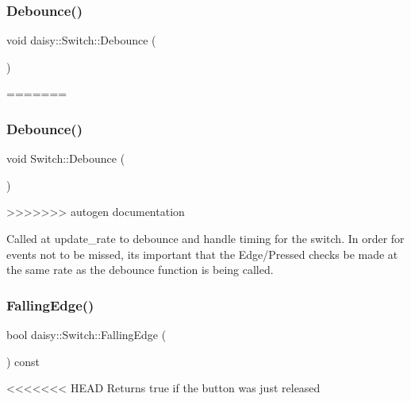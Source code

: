\subsubsection{\texorpdfstring{Debounce()}{Debounce()}}
{\footnotesize\ttfamily void daisy\+::\+Switch\+::\+Debounce (\begin{DoxyParamCaption}{ }\end{DoxyParamCaption})}
=======
\mbox{\label{classdaisy_1_1_switch_aa099b4d8f0d7073dd6d5c2f6e9d81d9c}} 
\subsubsection{\texorpdfstring{Debounce()}{Debounce()}}
{\footnotesize\ttfamily void Switch\+::\+Debounce (\begin{DoxyParamCaption}{ }\end{DoxyParamCaption})}
>>>>>>> autogen documentation

Called at update\+\_\+rate to debounce and handle timing for the switch. In order for events not to be missed, its important that the Edge/\+Pressed checks be made at the same rate as the debounce function is being called. \mbox{\label{classdaisy_1_1_switch_ad41940a1ce698fd80fedb01ceaa240fa}} 
\subsubsection{\texorpdfstring{Falling\+Edge()}{FallingEdge()}}
{\footnotesize\ttfamily bool daisy\+::\+Switch\+::\+Falling\+Edge (\begin{DoxyParamCaption}{ }\end{DoxyParamCaption}) const\hspace{0.3cm}{\ttfamily [inline]}}

<<<<<<< HEAD
Returns true if the button was just released \mbox{\label{classdaisy_1_1_switch_a8ca509a85dbe09f1d27bcc4ae03fc17a}} 
